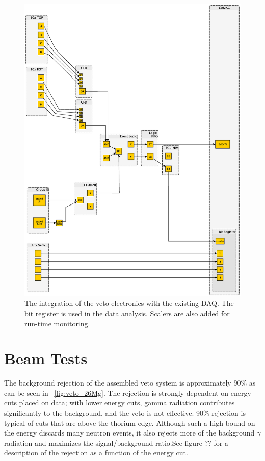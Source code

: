 \begin{figure}[htp]
\centering
\includegraphics[width=1.0\textwidth]{figures/electronics_veto.eps}
\caption{The integration of the veto electronics with the existing DAQ.  The bit register is used in the data analysis.  Scalers are also added for run-time monitoring.}
\label{fig:vetoElectronics}
\end{figure}
 

\section{Beam Tests}

The background rejection of the assembled veto system is approximately 90\% as can be seen in {\fig}~\ref{fig:veto_26Mg}.  The rejection is strongly dependent on energy cuts placed on data; with lower energy cuts, gamma radiation contributes significantly to the background, and the veto is not effective.  90\% rejection is typical of cuts that are above the thorium edge.  Although such a high bound on the energy discards many neutron events, it also rejects more of the background $\gamma$ radiation and maximizes the signal/background ratio.See figure ?? for a description of the rejection as a function of the energy cut. 

